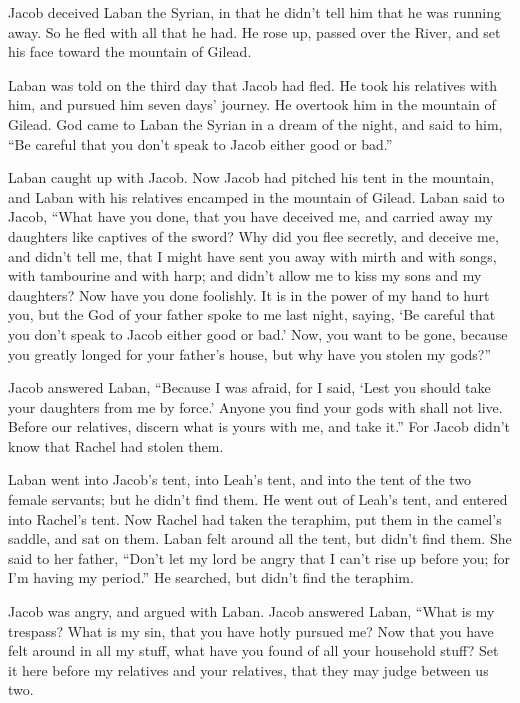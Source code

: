 {\par }{\PP {}Jacob deceived Laban the Syrian, in that he didn’t tell him that he was running away.
So he fled with all that he had. He rose up, passed over the River, and set his face toward the mountain of Gilead.
\par }{\PP {}Laban was told on the third day that Jacob had fled.
He took his relatives with him, and pursued him seven days’ journey. He overtook him in the mountain of Gilead.
God came to Laban the Syrian in a dream of the night, and said to him, “Be careful that you don’t speak to Jacob either good or bad.”
\par }{\PP {}Laban caught up with Jacob. Now Jacob had pitched his tent in the mountain, and Laban with his relatives encamped in the mountain of Gilead.
Laban said to Jacob, “What have you done, that you have deceived me, and carried away my daughters like captives of the sword?
Why did you flee secretly, and deceive me, and didn’t tell me, that I might have sent you away with mirth and with songs, with tambourine and with harp;
and didn’t allow me to kiss my sons and my daughters? Now have you done foolishly.
It is in the power of my hand to hurt you, but the God of your father spoke to me last night, saying, ‘Be careful that you don’t speak to Jacob either good or bad.’
Now, you want to be gone, because you greatly longed for your father’s house, but why have you stolen my gods?”
\par }{\PP {}Jacob answered Laban, “Because I was afraid, for I said, ‘Lest you should take your daughters from me by force.’
Anyone you find your gods with shall not live. Before our relatives, discern what is yours with me, and take it.” For Jacob didn’t know that Rachel had stolen them.
\par }{\PP {}Laban went into Jacob’s tent, into Leah’s tent, and into the tent of the two female servants; but he didn’t find them. He went out of Leah’s tent, and entered into Rachel’s tent.
Now Rachel had taken the teraphim, put them in the camel’s saddle, and sat on them. Laban felt around all the tent, but didn’t find them.
She said to her father, “Don’t let my lord be angry that I can’t rise up before you; for I’m having my period.” He searched, but didn’t find the teraphim.
\par }{\PP {}Jacob was angry, and argued with Laban. Jacob answered Laban, “What is my trespass? What is my sin, that you have hotly pursued me?
Now that you have felt around in all my stuff, what have you found of all your household stuff? Set it here before my relatives and your relatives, that they may judge between us two.
}
